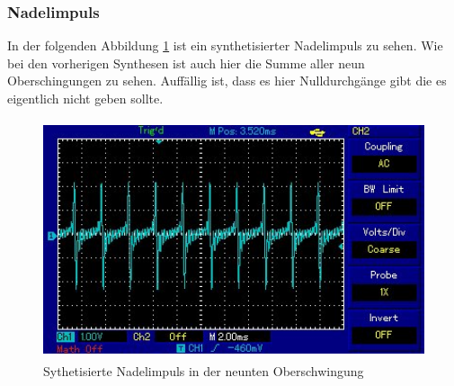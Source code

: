 \subsubsection{Nadelimpuls}
In der folgenden Abbildung \ref{fig:sn} ist ein synthetisierter Nadelimpuls zu sehen. Wie bei
den vorherigen Synthesen ist auch hier die Summe aller neun Oberschingungen zu sehen. Auffällig
 ist, dass es hier Nulldurchgänge gibt die es eigentlich nicht geben sollte.
\begin{figure}
  \centering
  \includegraphics[height = 7cm]{Prints/14.jpg}
  \caption{Sythetisierte Nadelimpuls in der neunten Oberschwingung}
  \label{fig:sn}
\end{figure}
\FloatBarrier
